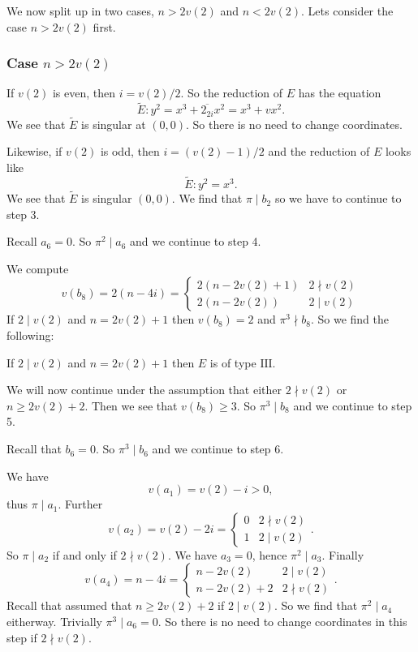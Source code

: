 We now split up in two cases, $n > 2v(2)$ and $n < 2v(2)$. 
Lets consider the case  $n > 2v(2)$ first.
\subsubsection{Case $n > 2v(2)$} \label{sec:case_n_>_2v2$}

If $v(2)$ is even, then $i = v(2) / 2$. 
So the reduction of $E$ has the equation \[
	\tilde E: y^2 = x^3  + \overline{2_{2i}} x^2  = x^3 + vx^2 
.\]
We see that $\tilde E$ is singular at $(0,0)$. 
So there is no need to change coordinates.

Likewise, if $v(2)$ is odd, 
then $i = (v(2)-1) / 2$ and the reduction of $E$ looks like 
\[
\tilde E: y^2 = x^3 
.\] 
We see that  $\tilde E$ is singular $(0, 0)$. 
We find that $\pi \mid b_2$ so we have to continue to step 3. 

Recall $a_6 = 0$. So $\pi^2 \mid a_6$ and we continue to step 4. 

We compute \[
	v(b_8) = 2(n - 4i) = \begin{cases}
		2(n - 2v(2) + 1) & 2 \nmid v(2) \\
		2(n - 2v(2)) & 2 \mid v(2) 
	\end{cases} 
\]
If $2\mid v(2)$ and $n = 2v(2) + 1$ then $v(b_8) = 2$ and $\pi^3 \nmid b_8$. 
So we find the following:
\begin{tateconclusion}
	If $2 \mid v(2)$ and $n = 2v(2) + 1$ then $E$ is of type $\mathrm{III}$.
\end{tateconclusion}
We will now continue under the assumption that either $2\nmid v(2) $ or $n \ge 2v(2) +2$.
Then we see that $v(b_8) \ge 3$. 
So $\pi^3\mid b_8$ and we continue to step 5.

Recall that $b_6 = 0$. So $\pi^3 \mid b_6$ and we continue to step 6. 

We have  \[
	v(a_1) = v(2) - i > 0
,\] 
thus $\pi \mid a_1$. 
Further \[
	v(a_2) = v(2) - 2i = \begin{cases}
		0 & 2 \nmid v(2) \\
		1 & 2 \mid v(2)
	\end{cases}
.\] 
So $\pi \mid a_2$ if and only if $2 \nmid v(2)$.
We have $a_3 = 0$, hence $\pi^2 \mid a_3$. 
Finally \[
	v(a_4) = n - 4i = \begin{cases}
		n - 2v(2) & 2 \mid v(2) \\
		n - 2v(2) + 2 & 2 \nmid v(2)
	\end{cases}
.\] 
Recall that assumed that $n \ge 2v(2) + 2$ if $2 \mid v(2)$. 
So we find that $\pi^2 \mid a_4$ eitherway. 
Trivially $\pi^3 \mid a_6 = 0$. 
So there is no need to change coordinates in this step if $2\nmid v(2)$. 


